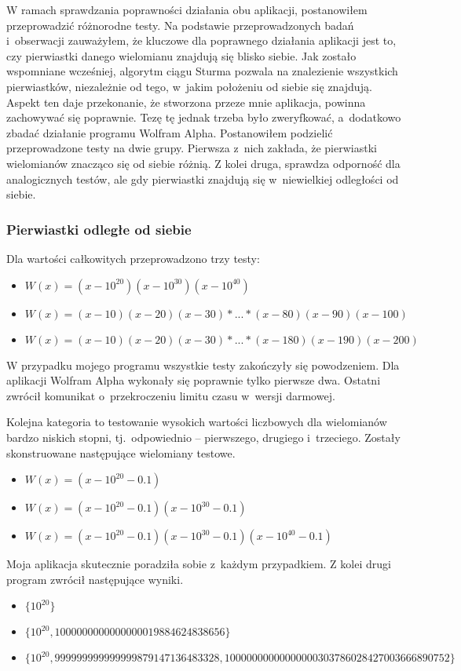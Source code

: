 W ramach sprawdzania poprawności działania obu aplikacji, postanowiłem przeprowadzić różnorodne testy. Na podstawie przeprowadzonych badań i~obserwacji zauważyłem, że kluczowe dla poprawnego działania aplikacji jest to, czy pierwiastki danego wielomianu znajdują się blisko siebie. Jak zostało wspomniane wcześniej, algorytm ciągu Sturma pozwala na znalezienie wszystkich pierwiastków, niezależnie od tego, w~jakim położeniu od siebie się znajdują. Aspekt ten daje przekonanie, że stworzona przeze mnie aplikacja, powinna zachowywać się poprawnie. Tezę tę jednak trzeba było zweryfkować, a~dodatkowo zbadać działanie programu Wolfram Alpha. Postanowiłem podzielić przeprowadzone testy na dwie grupy. Pierwsza z~nich zakłada, że pierwiastki wielomianów znacząco się od siebie różnią. Z kolei druga, sprawdza odporność dla analogicznych testów, ale gdy pierwiastki znajdują się w~niewielkiej odległości od siebie.

\subsubsection {Pierwiastki odległe od siebie}

Dla wartości całkowitych przeprowadzono trzy testy:
\begin{itemize}
	\item $W(x)=(x-10^{20})(x-10^{30})(x-10^{40})$
	\item $W(x)=(x-10)(x-20)(x-30)*...*(x-80)(x-90)(x-100)$
	\item $W(x)=(x-10)(x-20)(x-30)*...*(x-180)(x-190)(x-200)$
\end{itemize}

W przypadku mojego programu wszystkie testy zakończyły się powodzeniem. Dla aplikacji Wolfram Alpha wykonały się poprawnie tylko pierwsze dwa. Ostatni zwrócił komunikat o~przekroczeniu limitu czasu w~wersji darmowej.

Kolejna kategoria to testowanie wysokich wartości liczbowych dla wielomianów bardzo niskich stopni, tj.\ odpowiednio -- pierwszego, drugiego i~trzeciego. Zostały skonstruowane następujące wielomiany testowe.
\begin{itemize}
	\item $W(x)=(x-10^{20}-0.1)$
	\item $W(x)=(x-10^{20}-0.1)(x-10^{30}-0.1)$
	\item $W(x)=(x-10^{20}-0.1)(x-10^{30}-0.1)(x-10^{40}-0.1)$
\end{itemize}

Moja aplikacja skutecznie poradziła sobie z~każdym przypadkiem. Z kolei drugi program zwrócił następujące wyniki.
\begin{itemize}
	\item $\{10^{20}\}$
	\item $\{10^{20}, 1000000000000000019884624838656\}$
	\item $\{10^{20}, 999999999999999879147136483328, 10000000000000000303786028427003666890752\}$
\end{itemize}


